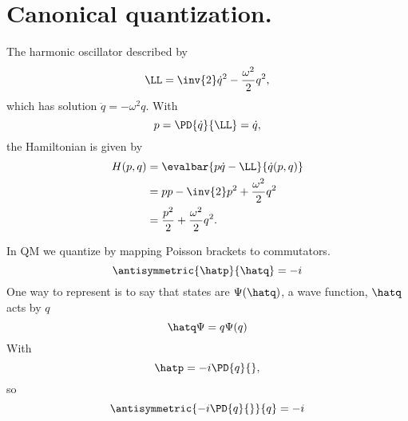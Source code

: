 %
%
\section{Canonical quantization.}

The harmonic oscillator described by
\begin{equation}\label{eqn:qftLecture4:740}
\LL = \inv{2} \dot{q}^2 - \frac{\omega^2}{2} q^2,
\end{equation}
which has solution \(\ddot{q} = - \omega^2 q\).
With
\begin{equation}\label{eqn:qftLecture4:760}
p = \PD{\dot{q}}{\LL} = \dot{q},
\end{equation}
the Hamiltonian is given by
\begin{equation}\label{eqn:qftLecture4:780}
\begin{aligned}
H(p,q)
&= \evalbar{p \dot{q} - \LL}{\dot{q}(p, q)} \\
&= p p - \inv{2} p^2 + \frac{\omega^2}{2} q^2 \\
&= \frac{p^2}{2} + \frac{\omega^2}{2} q^2.
\end{aligned}
\end{equation}

In QM we quantize by mapping Poisson brackets to commutators.
\begin{equation}\label{eqn:qftLecture4:800}
\antisymmetric{\hatp}{\hatq} = -i
\end{equation}
One way to represent is to say that states are \( \Psi(\hatq) \), a wave function, \( \hatq \) acts by \( q \)
\begin{equation}\label{eqn:qftLecture4:820}
\hatq \Psi = q \Psi(q)
\end{equation}
With
\begin{equation}\label{eqn:qftLecture4:840}
\hatp = -i \PD{q}{},
\end{equation}
so
\begin{equation}\label{eqn:qftLecture4:860}
\antisymmetric{ -i \PD{q}{} } { q} = -i
\end{equation}
